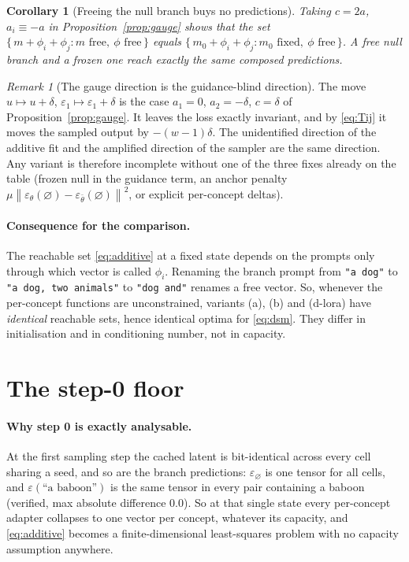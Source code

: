 \documentclass[11pt]{article}
\newcommand{\eps}{\varepsilon}
\newcommand{\epsth}{\eps_\theta}
\newcommand{\epsfr}{\eps_{\bar\theta}}
\newcommand{\norm}[1]{\left\lVert #1 \right\rVert}
\newcommand{\cnull}{\varnothing}
\theoremstyle{plain}
\newtheorem{corollary}[proposition]{Corollary}
\theoremstyle{remark}
\newtheorem{remark}[proposition]{Remark}
\begin{document}
\begin{corollary}[Freeing the null branch buys no predictions]
\label{cor:null}
Taking $c = 2a$, $a_i \equiv -a$ in Proposition~\ref{prop:gauge} shows that the set
$\{\,m + \phi_i + \phi_j : m \text{ free},\ \phi \text{ free}\,\}$ equals
$\{\,m_0 + \phi_i + \phi_j : m_0 \text{ fixed},\ \phi \text{ free}\,\}$. A free null branch and
a frozen one reach exactly the same composed predictions.
\end{corollary}

\begin{remark}[The gauge direction is the guidance-blind direction]
The move $u \mapsto u + \delta$, $\eps_1 \mapsto \eps_1 + \delta$ is the case $a_1 = 0$,
$a_2 = -\delta$, $c = \delta$ of Proposition~\ref{prop:gauge}. It leaves the loss exactly
invariant, and by \eqref{eq:Tij} it moves the sampled output by $-(w-1)\delta$. The
unidentified direction of the additive fit and the amplified direction of the sampler are the
same direction. Any variant is therefore incomplete without one of the three fixes already on
the table (frozen null in the guidance term, an anchor penalty
$\mu\norm{\epsth(\cnull) - \epsfr(\cnull)}^2$, or explicit per-concept deltas).
\end{remark}

\paragraph{Consequence for the comparison.}
The reachable set \eqref{eq:additive} at a fixed state depends on the prompts only through
which vector is called $\phi_i$. Renaming the branch prompt from \texttt{"a dog"} to
\texttt{"a dog, two animals"} to \texttt{"dog and"} renames a free vector. So, whenever the
per-concept functions are unconstrained, variants (a), (b) and (d-lora) have \emph{identical}
reachable sets, hence identical optima for \eqref{eq:dsm}. They differ in initialisation and in
conditioning number, not in capacity.

\section{The step-0 floor}
\label{sec:floor}

\paragraph{Why step 0 is exactly analysable.}
At the first sampling step the cached latent is bit-identical across every cell sharing a seed,
and so are the branch predictions: $\eps_\cnull$ is one tensor for all cells, and
$\eps(\text{``a baboon''})$ is the same tensor in every pair containing a baboon (verified, max
absolute difference $0.0$). So at that single state every per-concept adapter collapses to one
vector per concept, whatever its capacity, and \eqref{eq:additive} becomes a finite-dimensional
least-squares problem with no capacity assumption anywhere.
\end{document}
